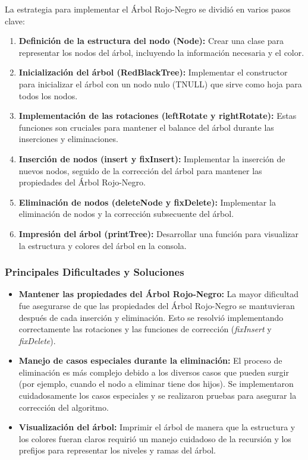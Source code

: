 \documentclass[12pt]{article}
\begin{document}
La estrategia para implementar el Árbol Rojo-Negro se dividió en varios pasos clave:
\begin{enumerate}
    \item \textbf{Definición de la estructura del nodo (Node):} Crear una clase para representar los nodos del árbol, incluyendo la información necesaria y el color.
    \item \textbf{Inicialización del árbol (RedBlackTree):} Implementar el constructor para inicializar el árbol con un nodo nulo (TNULL) que sirve como hoja para todos los nodos.
    \item \textbf{Implementación de las rotaciones (leftRotate y rightRotate):} Estas funciones son cruciales para mantener el balance del árbol durante las inserciones y eliminaciones.
    \item \textbf{Inserción de nodos (insert y fixInsert):} Implementar la inserción de nuevos nodos, seguido de la corrección del árbol para mantener las propiedades del Árbol Rojo-Negro.
    \item \textbf{Eliminación de nodos (deleteNode y fixDelete):} Implementar la eliminación de nodos y la corrección subsecuente del árbol.
    \item \textbf{Impresión del árbol (printTree):} Desarrollar una función para visualizar la estructura y colores del árbol en la consola.
\end{enumerate}

\subsubsection{Principales Dificultades y Soluciones}

\begin{itemize}
    \item \textbf{Mantener las propiedades del Árbol Rojo-Negro:} La mayor dificultad fue asegurarse de que las propiedades del Árbol Rojo-Negro se mantuvieran después de cada inserción y eliminación. Esto se resolvió implementando correctamente las rotaciones y las funciones de corrección (\textit{fixInsert} y \textit{fixDelete}).
    \item \textbf{Manejo de casos especiales durante la eliminación:} El proceso de eliminación es más complejo debido a los diversos casos que pueden surgir (por ejemplo, cuando el nodo a eliminar tiene dos hijos). Se implementaron cuidadosamente los casos especiales y se realizaron pruebas para asegurar la corrección del algoritmo.
    \item \textbf{Visualización del árbol:} Imprimir el árbol de manera que la estructura y los colores fueran claros requirió un manejo cuidadoso de la recursión y los prefijos para representar los niveles y ramas del árbol.
\end{itemize}
\end{document}
